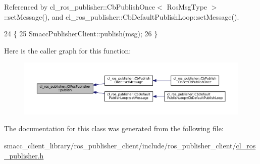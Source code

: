 Referenced by cl\+\_\+ros\+\_\+publisher\+::\+Cb\+Publish\+Once$<$ Ros\+Msg\+Type $>$\+::set\+Message(), and cl\+\_\+ros\+\_\+publisher\+::\+Cb\+Default\+Publish\+Loop\+::set\+Message().


\begin{DoxyCode}
24     \{
25         SmaccPublisherClient::publish(msg);
26     \}
\end{DoxyCode}
Here is the caller graph for this function\+:
\nopagebreak
\begin{figure}[H]
\begin{center}
\leavevmode
\includegraphics[width=350pt]{classcl__ros__publisher_1_1ClRosPublisher_a3517d62fb0703a0a72efe6de7ad1a6d8_icgraph}
\end{center}
\end{figure}


The documentation for this class was generated from the following file\+:\begin{DoxyCompactItemize}
\item 
smacc\+\_\+client\+\_\+library/ros\+\_\+publisher\+\_\+client/include/ros\+\_\+publisher\+\_\+client/\hyperlink{cl__ros__publisher_8h}{cl\+\_\+ros\+\_\+publisher.\+h}\end{DoxyCompactItemize}
